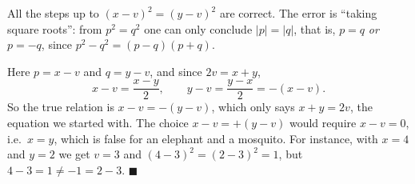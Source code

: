 All the steps up to $(x-v)^2=(y-v)^2$ are correct. The error is ``taking square roots'': from $p^2=q^2$ one can only conclude $|p|=|q|$, that is, $p=q$ \emph{or} $p=-q$, since $p^2-q^2=(p-q)(p+q)$.

Here $p=x-v$ and $q=y-v$, and since $2v=x+y$,
\[
x-v=\dfrac{x-y}{2},\qquad y-v=\dfrac{y-x}{2}=-(x-v).
\]
So the true relation is $x-v=-(y-v)$, which only says $x+y=2v$, the equation we started with. The choice $x-v=+(y-v)$ would require $x-v=0$, i.e.\ $x=y$, which is false for an elephant and a mosquito. For instance, with $x=4$ and $y=2$ we get $v=3$ and $(4-3)^2=(2-3)^2=1$, but $4-3=1\ne-1=2-3$. $\blacksquare$
